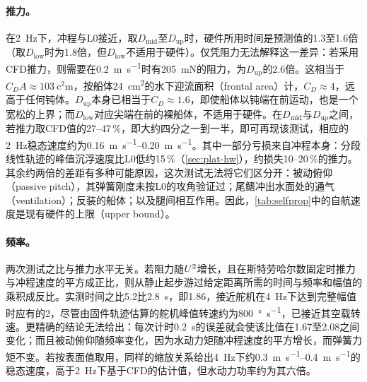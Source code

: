 \paragraph{推力。}在\SI{2}{\hertz}下，冲程与L0接近，取$D_\text{mid}$至$D_\text{up}$时，硬件所用时间是预测值的1.3至1.6倍（取$D_\text{low}$时为1.8倍，但$D_\text{low}$不适用于硬件）。仅凭阻力无法解释这一差异：若采用CFD推力，则需要在\SI{0.2}{\metre\per\second}时有\SI{205}{\milli\newton}的阻力，为$D_\text{up}$的2.6倍。这相当于$C_DA\approx\SI{103}{\square\centi\metre}$，按船体\SI{24}{\square\centi\metre}的水下迎流面积（frontal area）计，$C_D\approx4$，远高于任何钝体。$D_\text{up}$本身已相当于$C_D\approx1.6$，即使船体以钝端在前运动，也是一个宽松的上界；而$D_\text{low}$对应尖端在前的裸船体，不适用于硬件。在$D_\text{mid}$与$D_\text{up}$之间，若推力取CFD值的27--47\,\%，即大约四分之一到一半，即可再现该测试，相应的\SI{2}{\hertz}稳态速度约为\SIrange{0.16}{0.20}{\metre\per\second}。其中一部分亏损来自冲程本身：分段线性轨迹的峰值沉浮速度比L0低约15\,\%（\cref{sec:plat-hw}），约损失10--20\,\%的推力。其余约两倍的差距有多种可能原因，这次测试无法将它们区分开：被动俯仰（passive pitch），其弹簧刚度未按L0的攻角验证过；尾鳍冲出水面处的通气（ventilation）；反装的船体；以及腿间相互作用。因此，\cref{tab:selfprop}中的自航速度是现有硬件的上限（upper bound）。

\paragraph{频率。}两次测试之比与推力水平无关。若阻力随$U^2$增长，且在斯特劳哈尔数固定时推力与冲程速度的平方成正比，则从静止起步游过给定距离所需的时间与频率和幅值的乘积成反比。实测时间之比\SI{5.2}{}比\SI{2.8}{\second}，即1.86，接近舵机在\SI{4}{\hertz}下达到完整幅值时应有的2，尽管由固件轨迹估算的舵机峰值转速约为\SI{800}{\degree\per\second}，已接近其空载转速。更精确的结论无法给出：每次计时\SI{0.2}{\second}的误差就会使该比值在1.67至2.08之间变化；而且被动俯仰随频率变化，因为水动力矩随冲程速度的平方增长，而弹簧力矩不变。若按表面值取用，同样的缩放关系给出\SI{4}{\hertz}下约\SIrange{0.3}{0.4}{\metre\per\second}的稳态速度，高于\SI{2}{\hertz}下基于CFD的估计值，但水动力功率约为其六倍。
